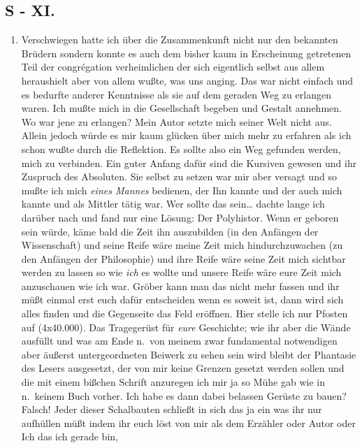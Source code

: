 \documentclass[
]{article}
\author{}
\date{\vspace{-2.5em}}
\providecommand{\tightlist}{%
  \setlength{\itemsep}{0pt}\setlength{\parskip}{0pt}}
\begin{document}
\subsection{S - XI.}\label{s---xi.}

\begin{enumerate}
\def\labelenumi{\arabic{enumi}.}
\setcounter{enumi}{3}
\tightlist
\item
  Verschwiegen hatte ich über die Zusammenkunft nicht nur den bekannten
  Brüdern sondern konnte es auch dem bisher kaum in Erscheinung
  getretenen Teil der congrégation verheimlichen der sich eigentlich
  selbst aus allem heraushielt aber von allem wußte, was uns anging. Das
  war nicht einfach und es bedurfte anderer Kenntnisse als sie auf dem
  geraden Weg zu erlangen waren. Ich mußte mich in die Gesellschaft
  begeben und Gestalt annehmen. Wo war jene zu erlangen? Mein Autor
  setzte mich seiner Welt nicht aus. Allein jedoch würde es mir kaum
  glücken über mich mehr zu erfahren als ich schon wußte durch die
  Reflektion. Es sollte also ein Weg gefunden werden, mich zu verbinden.
  Ein guter Anfang dafür sind die Kursiven gewesen und ihr Zuspruch des
  Absoluten. Sie selbst zu setzen war mir aber versagt und so mußte ich
  mich \emph{eines Mannes} bedienen, der Ihn kannte und der auch mich
  kannte und als Mittler tätig war. Wer sollte das sein\ldots{} dachte
  lange ich darüber nach und fand nur eine Lösung: Der Polyhistor. Wenn
  er geboren sein würde, käme bald die Zeit ihn auszubilden (in den
  Anfängen der Wissenschaft) und seine Reife wäre meine Zeit mich
  hindurchzuwachen (zu den Anfängen der Philosophie) und ihre Reife wäre
  seine Zeit mich sichtbar werden zu lassen so wie \emph{ich} es wollte
  und unsere Reife wäre eure Zeit mich anzuschauen wie ich war. Gröber
  kann man das nicht mehr fassen und ihr müßt einmal erst euch dafür
  entscheiden wenn es soweit ist, dann wird sich alles finden und die
  Gegenseite das Feld eröffnen. Hier stelle ich nur Pfosten auf
  (4x40.000). Das Tragegerüst für \emph{eure} Geschichte; wie ihr aber
  die Wände ausfüllt und was am Ende n.~von meinem zwar fundamental
  notwendigen aber äußerst untergeordneten Beiwerk zu sehen sein wird
  bleibt der Phantasie des Lesers ausgesetzt, der von mir keine Grenzen
  gesetzt werden sollen und die mit einem bißchen Schrift anzuregen ich
  mir ja so Mühe gab wie in n.~keinem Buch vorher. Ich habe es dann
  dabei belassen Gerüste zu bauen? Falsch! Jeder dieser Schalbauten
  schließt in sich das ja ein was ihr nur aufhüllen müßt indem ihr euch
  löst von mir als dem Erzähler oder Autor oder Ich das ich gerade bin,

\end{enumerate}
\end{document}
